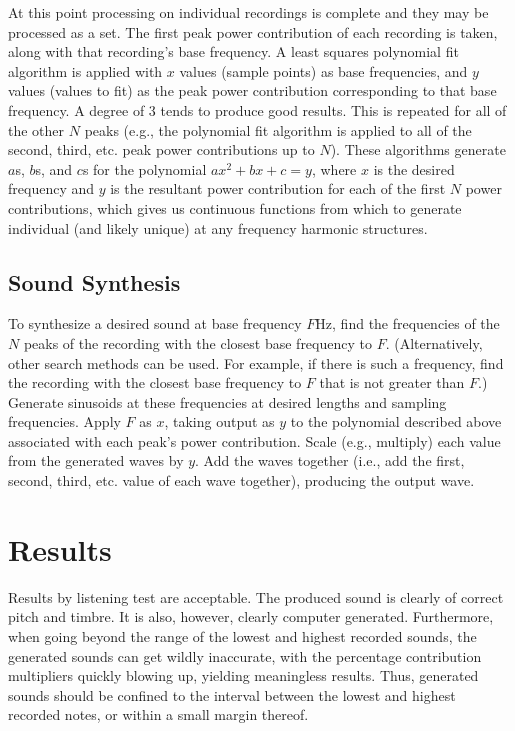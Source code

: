 \documentclass{article}
\begin{document}
At this point processing on individual recordings is complete and they may be processed as a set. The first peak power contribution of each recording is taken, along with that recording's base frequency. A least squares polynomial fit algorithm is applied with $x$ values (sample points) as base frequencies, and $y$ values (values to fit) as the peak power contribution corresponding to that base frequency. A degree of 3 tends to produce good results. This is repeated for all of the other $N$ peaks (e.g., the polynomial fit algorithm is applied to all of the second, third, etc. peak power contributions up to $N$). These algorithms generate $a$s, $b$s, and $c$s for the polynomial $a x^2 + b x + c = y$, where $x$ is the desired frequency and $y$ is the resultant power contribution for each of the first $N$ power contributions, which gives us continuous functions from which to generate individual (and likely unique) at any frequency harmonic structures.

\subsection{Sound Synthesis}

To synthesize a desired sound at base frequency $F$Hz, find the frequencies of the $N$ peaks of the recording with the closest base frequency to $F$. (Alternatively, other search methods can be used. For example, if there is such a frequency, find the recording with the closest base frequency to $F$ that is not greater than $F$.) Generate sinusoids at these frequencies at desired lengths and sampling frequencies. Apply $F$ as $x$, taking output as $y$ to the polynomial described above associated with each peak's power contribution. Scale (e.g., multiply) each value from the generated waves by $y$. Add the waves together (i.e., add the first, second, third, etc. value of each wave together), producing the output wave.

\section{Results}

Results by listening test are acceptable. The produced sound is clearly of correct pitch and timbre. It is also, however, clearly computer generated. Furthermore, when going beyond the range of the lowest and highest recorded sounds, the generated sounds can get wildly inaccurate, with the percentage contribution multipliers quickly blowing up, yielding meaningless results. Thus, generated sounds should be confined to the interval between the lowest and highest recorded notes, or within a small margin thereof.
\end{document}
